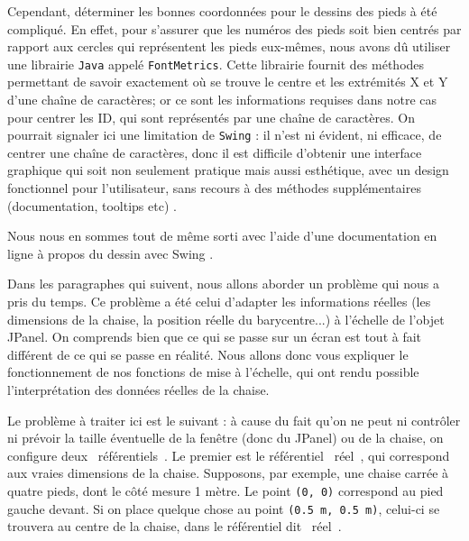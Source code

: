 \documentclass{polytech/polytech}
\begin{document}
Cependant, déterminer les bonnes coordonnées pour le dessins des pieds à été compliqué. En effet, pour s'assurer que les numéros des pieds soit bien centrés par rapport aux cercles qui représentent les pieds eux-mêmes, nous avons dû utiliser une librairie \texttt{Java} appelé \texttt{FontMetrics}. 
Cette librairie fournit des méthodes permettant de savoir exactement où se trouve le centre et les extrémités X et Y d'une chaîne de caractères; or ce sont les informations requises dans notre cas pour centrer les ID, qui sont représentés par une chaîne de caractères. 
On pourrait signaler ici une limitation de \texttt{Swing} : il n'est ni évident, ni efficace, de centrer une chaîne de caractères, donc il est difficile d'obtenir une interface graphique qui soit non seulement pratique mais aussi esthétique, avec un design fonctionnel pour l'utilisateur, sans recours à des méthodes supplémentaires (documentation, tooltips etc) .

Nous nous en sommes tout de même sorti avec l'aide d'une documentation en ligne à propos du dessin avec Swing \cite{ntu_swing}.


Dans les paragraphes qui suivent, nous allons aborder un problème qui nous a pris du temps. 
Ce problème a été celui d'adapter les informations réelles (les dimensions de la chaise, la position réelle du barycentre...) à l'échelle de l'objet JPanel. On comprends bien que ce qui se passe sur un écran est tout à fait différent de ce qui se passe en réalité. Nous allons donc vous expliquer le fonctionnement de nos fonctions de mise à l'échelle, qui ont rendu possible l'interprétation des données réelles de la chaise.

Le problème à traiter ici est le suivant : à cause du fait qu'on ne peut ni contrôler ni prévoir la taille éventuelle de la fenêtre (donc du JPanel) ou de la chaise, on configure deux \guillemotleft ~référentiels~\guillemotright . 
Le premier est le référentiel \guillemotleft ~réel~\guillemotright , qui correspond aux vraies dimensions de la chaise.
Supposons, par exemple, une chaise carrée à quatre pieds, dont le côté mesure 1 mètre.
Le point \texttt{(0, 0)} correspond au pied gauche devant.
Si on place quelque chose au point \texttt{(0.5 m, 0.5 m)}, celui-ci se trouvera au centre de la chaise, dans le référentiel dit \guillemotleft ~réel~\guillemotright . 
\end{document}
